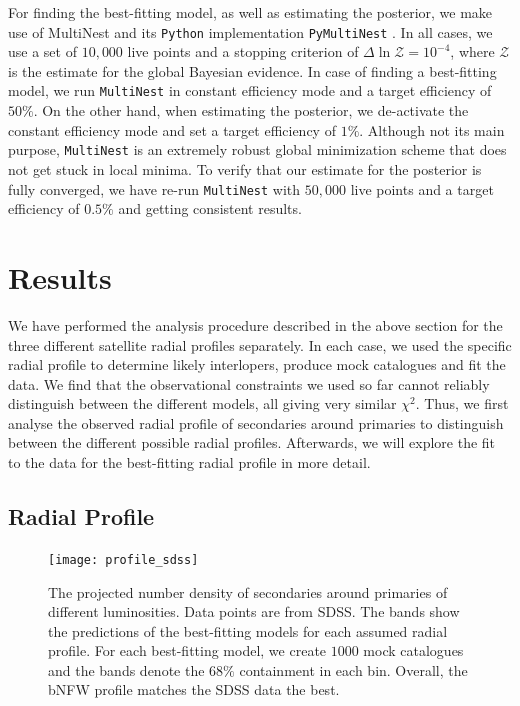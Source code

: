 \documentclass[fleqn,usenatbib,useAMS]{mnras}
\begin{document}
For finding the best-fitting model, as well as estimating the posterior, we make use of MultiNest \citep{Feroz+08, Feroz+09} and its \texttt{Python} implementation \texttt{PyMultiNest} \citep{Buchner+14}. In all cases, we use a set of $10,000$ live points and a stopping criterion of $\Delta \ln \mathcal{Z} = 10^{-4}$, where $\mathcal{Z}$ is the estimate for the global Bayesian evidence. In case of finding a best-fitting model, we run \texttt{MultiNest} in constant efficiency mode and a target efficiency of $50\%$. On the other hand, when estimating the posterior, we de-activate the constant efficiency mode and set a target efficiency of $1\%$. Although not its main purpose, \texttt{MultiNest} is an extremely robust global minimization scheme that does not get stuck in local minima. To verify that our estimate for the posterior is fully converged, we have re-run \texttt{MultiNest} with $50,000$ live points and a target efficiency of $0.5\%$ and getting consistent results. 

\section{Results}

We have performed the analysis procedure described in the above section for the three different satellite radial profiles separately. In each case, we used the specific radial profile to determine likely interlopers, produce mock catalogues and fit the data. We find that the observational constraints we used so far cannot reliably distinguish between the different models, all giving very similar $\chi^2$. Thus, we first analyse the observed radial profile of secondaries around primaries to distinguish between the different possible radial profiles. Afterwards, we will explore the fit to the data for the best-fitting radial profile in more detail.

\subsection{Radial Profile}

\begin{figure}
	\centering
	\texttt{[image: profile\_sdss]}
	\caption{The projected number density of secondaries around primaries of different luminosities. Data points are from SDSS. The bands show the predictions of the best-fitting models for each assumed radial profile. For each best-fitting model, we create $1000$ mock catalogues and the bands denote the $68\%$ containment in each bin. Overall, the bNFW profile matches the SDSS data the best.}
	\label{fig:profile}
\end{figure}
\end{document}
